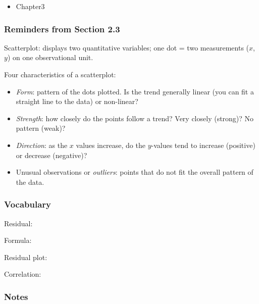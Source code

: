 \documentclass[
]{report}
\providecommand{\tightlist}{%
  \setlength{\itemsep}{0pt}\setlength{\parskip}{0pt}}
\newcommand{\rgs}{\vspace{12pt}} %
\newcommand{\rgi}{\hspace{24pt}}  %
\begin{document}
\begin{itemize}
\tightlist
\item
  Chapter3
\end{itemize}


\hypertarget{reminders-from-section-2.3}{%
\subsubsection*{Reminders from Section 2.3}\label{reminders-from-section-2.3}}

Scatterplot: displays two quantitative variables; one dot = two measurements (\(x\), \(y\)) on one observational unit.

Four characteristics of a scatterplot:

\begin{itemize}
\tightlist
\item
  \emph{Form}: pattern of the dots plotted. Is the trend generally linear (you can fit a straight line to the data) or non-linear?\\
\item
  \emph{Strength}: how closely do the points follow a trend? Very closely (strong)? No pattern (weak)?\\
\item
  \emph{Direction}: as the \(x\) values increase, do the \(y\)-values tend to increase (positive) or decrease (negative)?\\
\item
  Unusual observations or \emph{outliers}: points that do not fit the overall pattern of the data.
\end{itemize}


\hypertarget{vocabulary-6}{%
\subsubsection*{Vocabulary}\label{vocabulary-6}}

Residual:
\rgs

\rgi Formula:
\rgs

Residual plot:
\rgs

Correlation:
\rgs

\hypertarget{notes-8}{%
\subsubsection*{Notes}\label{notes-8}}
\end{document}
